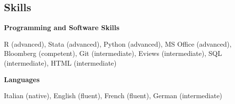 \documentclass[margin, line]{res}
\newenvironment{list1}{
 \begin{list}{\ding{113}}{%
  \setlength{\itemsep}{0in}
  \setlength{\parsep}{0in} \setlength{\parskip}{0in}
  \setlength{\topsep}{0in} \setlength{\partopsep}{0in} 
  \setlength{\leftmargin}{0.17in}}}{\end{list}}
\newenvironment{list2}{
 \begin{list}{$\bullet$}{%
  \setlength{\itemsep}{0in}
  \setlength{\parsep}{0in} \setlength{\parskip}{0in}
  \setlength{\topsep}{0in} \setlength{\partopsep}{0in} 
  \setlength{\leftmargin}{0.2in}}}{\end{list}}
\begin{document}
\begin{resume}
\begin{comment}


\end{comment}

\section{\sc Skills}

\textbf{Programming and Software Skills} \\
\vspace*{-.12in}
\begin{list1}
\item[] R (advanced), Stata (advanced), Python (advanced), MS Office (advanced), Bloomberg (competent), Git (intermediate), Eviews (intermediate), SQL (intermediate), HTML (intermediate)
\end{list1}

\textbf{Languages} \\
\vspace*{-.12in}
\begin{list1}
\item[] Italian (native), English (fluent), French (fluent), German (intermediate)
\end{list1}


\end{resume}
\end{document}
